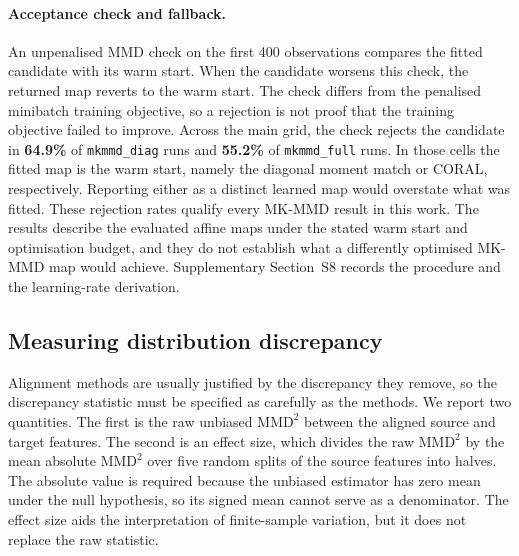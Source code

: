 \paragraph{Acceptance check and fallback.} An unpenalised MMD check on the
first 400 observations compares the fitted candidate with its warm start. When
the candidate worsens this check, the returned map reverts to the warm start.
The check differs from the penalised minibatch training objective, so a
rejection is not proof that the training objective failed to improve. Across
the main grid, the check rejects the candidate in \textbf{64.9\%} of
\texttt{mkmmd\_diag} runs and \textbf{55.2\%} of \texttt{mkmmd\_full} runs. In
those cells the fitted map is the warm start, namely the diagonal moment match
or CORAL, respectively. Reporting either as a distinct learned map would
overstate what was fitted. These rejection rates qualify every MK-MMD result in
this work. The results describe the evaluated affine maps under the stated
warm start and optimisation budget, and they do not establish what a
differently optimised MK-MMD map would achieve. Supplementary Section~S8
records the procedure and the learning-rate derivation.

\subsection{Measuring distribution discrepancy}
\label{sec:discrepancy}

Alignment methods are usually justified by the discrepancy they remove, so the
discrepancy statistic must be specified as carefully as the methods. We report
two quantities. The first is the raw unbiased $\mathrm{MMD}^2$ between the
aligned source and target features. The second is an effect size, which divides
the raw $\mathrm{MMD}^2$ by the mean absolute $\mathrm{MMD}^2$ over five random
splits of the source features into halves. The absolute value is required
because the unbiased estimator has zero mean under the null hypothesis, so its
signed mean cannot serve as a denominator. The effect size aids the
interpretation of finite-sample variation, but it does not replace the raw
statistic.

